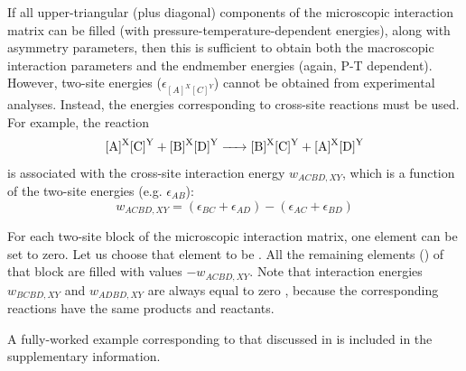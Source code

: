 \documentclass[preprint,12pt]{elsarticle}
\begin{document}
If all upper-triangular (plus diagonal) components of the microscopic interaction matrix can be filled (with pressure-temperature-dependent energies), along with asymmetry parameters, then this is sufficient to obtain both the macroscopic interaction parameters and the endmember energies (again, P-T dependent). However, two-site energies ($\epsilon_{[A]^X[C]^Y}$) cannot be obtained from experimental analyses. Instead, the energies corresponding to cross-site reactions must be used. For example, the reaction
\begin{equation}
    \ce{[A]^X[C]^Y + [B]^X[D]^Y -> [B]^X[C]^Y + [A]^X[D]^Y}
\end{equation}
is associated with the cross-site interaction energy $w_{ACBD,XY}$, which is a function of the two-site energies (e.g. $\epsilon_{AB}$):
\begin{equation}
    w_{ACBD,XY} = (\epsilon_{BC} + \epsilon_{AD}) - (\epsilon_{AC} + \epsilon_{BD})
\end{equation}

For each two-site block of the microscopic interaction matrix, one element can be set to zero. Let us choose that element to be . All the remaining elements () of that block are filled with values $-w_{ACBD,XY}$. Note that interaction energies $w_{BCBD,XY}$ and $w_{ADBD,XY}$ are always equal to zero \citep{PH1993}, because the corresponding reactions have the same products and reactants. 

A fully-worked example corresponding to that discussed in \cite{Powell2014} is included in the supplementary information.
\end{document}

